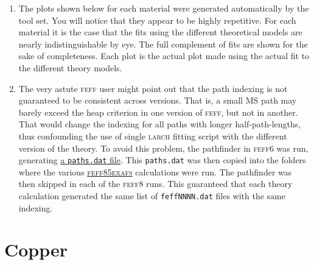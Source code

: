 \documentclass[11pt]{article}
\begin{document}
\begin{enumerate}
\item The plots shown below for each material were generated
  automatically by the tool set.  You will notice that they appear to
  be highly repetitive.  For each material it is the case that the
  fits using the different theoretical models are nearly
  indistinguishable by eye.  The full complement of fits are shown for
  the sake of completeness.  Each plot is the actual plot made using
  the actual fit to the different theory models.

\item The very astute \textsc{feff} user might point out that the path
  indexing is not guaranteed to be consistent across versions.  That
  is, a small MS path may barely exceed the heap criterion in one
  version of \textsc{feff}, but not in another.  That would change the
  indexing for all paths with longer half-path-lengths, thus
  confounding the use of single \textsc{larch} fitting script with the
  different version of the theory.  To avoid this problem, the
  pathfinder in \textsc{feff6} was run, generating
  \href{http://leonardo.phys.washington.edu/feff/wiki/static/f/e/f/FEFF_Program_control_1397.html}{a
    \texttt{paths.dat} file}.  This \texttt{paths.dat} was then copied
  into the folders where the various
  \href{https://github.com/xraypy/feff85exafs}{\textsc{feff85exafs}}
  calculations were run.  The pathfinder was then skipped in each of
  the \textsc{feff8} runs.  This guaranteed that each theory
  calculation generated the same list of \texttt{feffNNNN.dat} files
  with the same indexing.

\end{enumerate}



\section{Copper}
\label{sec:orgheadline7}
\end{document}

